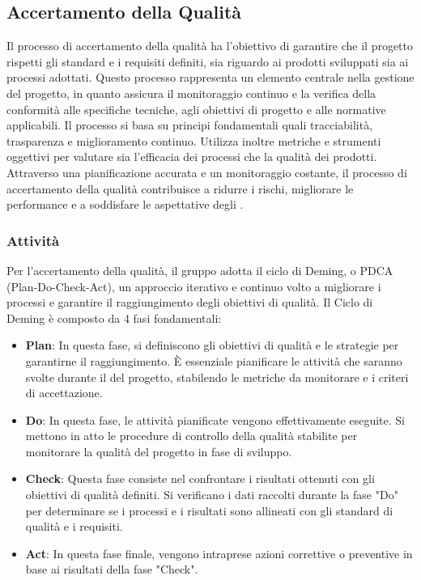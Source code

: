 \subsection{Accertamento della Qualità}
\label{subsec:accertamento_qualità}
Il processo di accertamento della qualità ha l'obiettivo di garantire che il progetto rispetti gli standard e i requisiti definiti, sia riguardo ai prodotti sviluppati sia ai processi adottati. 
Questo processo rappresenta un elemento centrale nella gestione del progetto, in quanto assicura il monitoraggio continuo e la verifica della conformità alle specifiche tecniche, agli obiettivi di progetto e alle normative applicabili.
Il processo si basa su principi fondamentali quali tracciabilità, trasparenza e miglioramento continuo.
Utilizza inoltre metriche e strumenti oggettivi per valutare sia l'efficacia dei processi che la qualità dei prodotti.
Attraverso una pianificazione accurata e un monitoraggio costante, il processo di accertamento della qualità contribuisce a ridurre i rischi, migliorare le performance e a soddisfare le aspettative degli .
\subsubsection{Attività}
Per l'accertamento della qualità, il gruppo adotta il ciclo di Deming, o PDCA (Plan-Do-Check-Act), un approccio iterativo e continuo volto a migliorare i processi e garantire il raggiungimento degli obiettivi di qualità.
Il Ciclo di Deming è composto da 4 fasi fondamentali:
\begin{itemize}
    \item \textbf{Plan}: In questa fase, si definiscono gli obiettivi di qualità e le strategie per garantirne il raggiungimento.
    È essenziale pianificare le attività che saranno svolte durante il  del progetto, stabilendo le metriche da monitorare e i criteri di accettazione.
    \item \textbf{Do}: In questa fase, le attività pianificate vengono effettivamente eseguite.
    Si mettono in atto le procedure di controllo della qualità stabilite per monitorare la qualità del progetto in fase di sviluppo.
    \item \textbf{Check}: Questa fase consiste nel confrontare i risultati ottenuti con gli obiettivi di qualità definiti.
    Si verificano i dati raccolti durante la fase "Do" per determinare se i processi e i risultati sono allineati con gli standard di qualità e i requisiti.
    \item \textbf{Act}: In questa fase finale, vengono intraprese azioni correttive o preventive in base ai risultati della fase "Check".
\end{itemize}
